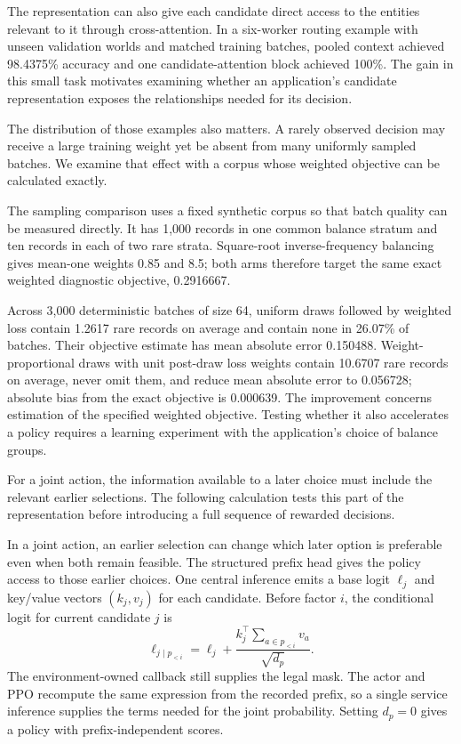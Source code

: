 \documentclass{strategynet-journal}
\begin{document}
The representation can also give each candidate direct access to the entities
relevant to it through cross-attention. In a six-worker routing example with
unseen validation worlds and matched training batches, pooled context achieved
98.4375\% accuracy and one candidate-attention block achieved 100\%.
The gain in this small task motivates examining whether an
application's candidate representation exposes the relationships needed for
its decision.

The distribution of those examples also matters. A rarely observed decision
may receive a large training weight yet be absent from many uniformly sampled
batches. We examine that effect with a corpus whose weighted objective can be
calculated exactly.

The sampling comparison uses a fixed synthetic corpus so that batch quality
can be measured directly. It has 1,000 records
in one common balance stratum and ten records in each of two rare strata.
Square-root inverse-frequency balancing gives mean-one weights 0.85 and 8.5;
both arms therefore target the same exact weighted diagnostic objective,
0.2916667.

Across 3,000 deterministic batches of size 64, uniform draws followed by
weighted loss contain 1.2617 rare records on average and contain none in
26.07\% of batches.  Their objective estimate has mean absolute error
0.150488.  Weight-proportional draws with unit post-draw loss weights contain
10.6707 rare records on average, never omit them, and reduce mean absolute
error to 0.056728; absolute bias from the exact objective is 0.000639.  The improvement concerns estimation of the specified weighted objective.
Testing whether it also accelerates a policy requires a learning experiment
with the application's choice of balance groups.

For a joint action, the information available to a later choice must include
the relevant earlier selections. The following calculation tests this part
of the representation before introducing a full sequence of rewarded decisions.

In a joint action, an earlier selection can change which later option is
preferable even when both remain feasible. The structured prefix head gives
the policy access to those earlier choices. One central inference emits a base logit $\ell_j$ and
key/value vectors $(k_j,v_j)$ for each candidate.  Before factor $i$, the
conditional logit for current candidate $j$ is
\[
  \ell_{j\mid p_{<i}} = \ell_j
  + \frac{k_j^\top\sum_{a\in p_{<i}}v_a}{\sqrt{d_p}}.
\]
The environment-owned callback still supplies the legal mask.  The actor and
PPO recompute the same expression from the recorded prefix, so a single service inference supplies the terms needed for the joint
probability. Setting $d_p=0$ gives a policy with prefix-independent scores.
\end{document}
